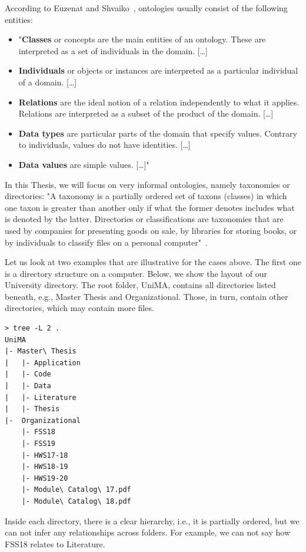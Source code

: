 According to Euzenat and Shvaiko~\cite[p. 34]{euzenat2007ontology}, ontologies usually consist of the
following entities:
\begin{itemize}
    \item "\textbf{Classes} or concepts are the main entities of an ontology.
          These are interpreted as a set of individuals in the domain. [\ldots]
    \item \textbf{Individuals} or objects or instances are interpreted as a particular individual of a domain. [\ldots]
    \item \textbf{Relations} are the ideal notion of a relation independently to what it applies.
          Relations are interpreted as a subset of the product of the domain. [\ldots]
    \item \textbf{Data types} are particular parts of the domain that specify values.
          Contrary to individuals, values do not have identities. [\ldots]
    \item \textbf{Data values} are simple values. [\ldots]"
\end{itemize}

In this Thesis, we will focus on very informal ontologies, namely taxonomies or directories:
"A taxonomy is a partially ordered set of taxons (classes) in which one taxon is greater than
another only if what the former denotes includes what is denoted by the latter.
Directories or classifications are taxonomies that are used by companies for presenting goods on sale,
by libraries for storing books, or by individuals to classify files on a personal computer"~\cite[p. 27]{euzenat2007ontology}.

Let us look at two examples that are illustrative for the cases above.
The first one is a directory structure on a computer.
Below, we show the layout of our University directory.
The root folder, UniMA, contains all directories listed beneath, e.g., Master Thesis and Organizational.
Those, in turn, contain other directories, which may contain more files.
\begin{verbatim}
> tree -L 2 .
UniMA
|- Master\ Thesis
|   |- Application
|   |- Code
|   |- Data
|   |- Literature
|   |- Thesis
|-  Organizational
    |- FSS18
    |- FSS19
    |- HWS17-18
    |- HWS18-19
    |- HWS19-20
    |- Module\ Catalog\ 17.pdf
    |- Module\ Catalog\ 18.pdf
\end{verbatim}
Inside each directory, there is a clear hierarchy, i.e., it is partially ordered, but we can not infer
any relationships across folders.
For example, we can not say how FSS18 relates to Literature.

